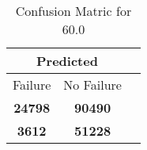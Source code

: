 \begin{table}[] 
\caption{Confusion Matric for 60.0} 
\label{Table: Prediction Accuracy-DMD60.0OnlySunEKF-combinationReflectionEKF-top2-Reflection} 
\centering 
\begin{tabular} 
 {@{}ccc@{}} 
\toprule 
\multicolumn{2}{c}{\textbf{Predicted}}
 \\ \midrule 
\multicolumn{1}{|c|}{Failure} & 
\multicolumn{1}{c|}{No Failure}
 \\ \midrule 
\multicolumn{1}{|c|}{\color{green}\textbf{24798}} & 
\multicolumn{1}{c|}{\color{green}\textbf{90490}}
 \\ \midrule 
\multicolumn{1}{|c|}{\color{red}\textbf{3612}} & 
\multicolumn{1}{c|}{\color{red}\textbf{51228}}
 \\ \bottomrule 
\end{tabular} 
\end{table} 
